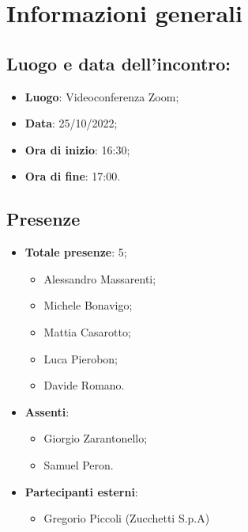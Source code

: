 \section{Informazioni generali}
    \subsection{Luogo e data dell'incontro:}
    \begin{itemize}
        \item \textbf{Luogo}: Videoconferenza Zoom;
        \item \textbf{Data}: 25/10/2022;
        \item \textbf{Ora di inizio}: 16:30;
        \item \textbf{Ora di fine}: 17:00.
    \end{itemize}
    \subsection{Presenze}
    \begin{itemize}
        \item \textbf{Totale presenze}: 5;
        \begin{itemize}
            \item Alessandro Massarenti;
            \item Michele Bonavigo;
            \item Mattia Casarotto;
            \item Luca Pierobon;
            \item Davide Romano.
        \end{itemize}
        \item \textbf{Assenti}:
        \begin{itemize}
            \item Giorgio Zarantonello;
            \item Samuel Peron.
        \end{itemize}
        \item \textbf{Partecipanti esterni}:
        \begin{itemize}
            \item Gregorio Piccoli (Zucchetti S.p.A)
        \end{itemize}
    \end{itemize}
